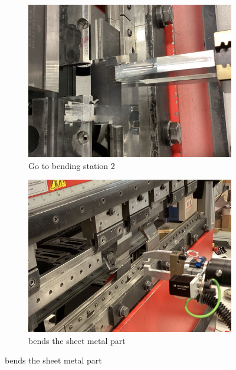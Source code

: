 \begin{figure}[h]
    \centering
    \begin{subfigure}[b]{0.32\textwidth}
        \centering
        \includegraphics[width=\textwidth]{figures/bending/bending2-003.png}
        \caption{Go to bending station 2}
        \label{subfig:bending2-before}
    \end{subfigure}\hspace{0.1cm}
    \begin{subfigure}[b]{0.32\textwidth}
        \centering
        \includegraphics[width=\textwidth]{figures/bending/bending2-001.png}
        \caption{bends the sheet metal part}
        \label{subfig:bending2}
    \end{subfigure}\hspace{0.1cm}

\end{figure}
